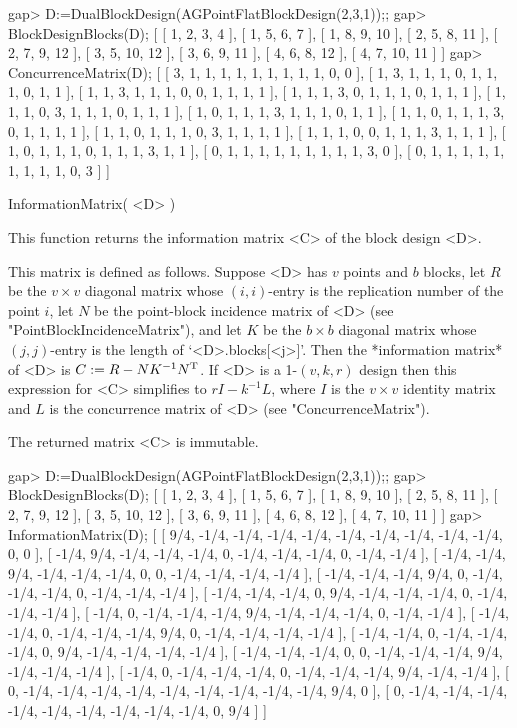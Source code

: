 \beginexample
gap> D:=DualBlockDesign(AGPointFlatBlockDesign(2,3,1));;
gap> BlockDesignBlocks(D);
[ [ 1, 2, 3, 4 ], [ 1, 5, 6, 7 ], [ 1, 8, 9, 10 ], [ 2, 5, 8, 11 ], 
  [ 2, 7, 9, 12 ], [ 3, 5, 10, 12 ], [ 3, 6, 9, 11 ], [ 4, 6, 8, 12 ], 
  [ 4, 7, 10, 11 ] ]
gap> ConcurrenceMatrix(D);
[ [ 3, 1, 1, 1, 1, 1, 1, 1, 1, 1, 0, 0 ], 
  [ 1, 3, 1, 1, 1, 0, 1, 1, 1, 0, 1, 1 ], 
  [ 1, 1, 3, 1, 1, 1, 0, 0, 1, 1, 1, 1 ], 
  [ 1, 1, 1, 3, 0, 1, 1, 1, 0, 1, 1, 1 ], 
  [ 1, 1, 1, 0, 3, 1, 1, 1, 0, 1, 1, 1 ], 
  [ 1, 0, 1, 1, 1, 3, 1, 1, 1, 0, 1, 1 ], 
  [ 1, 1, 0, 1, 1, 1, 3, 0, 1, 1, 1, 1 ], 
  [ 1, 1, 0, 1, 1, 1, 0, 3, 1, 1, 1, 1 ], 
  [ 1, 1, 1, 0, 0, 1, 1, 1, 3, 1, 1, 1 ], 
  [ 1, 0, 1, 1, 1, 0, 1, 1, 1, 3, 1, 1 ], 
  [ 0, 1, 1, 1, 1, 1, 1, 1, 1, 1, 3, 0 ], 
  [ 0, 1, 1, 1, 1, 1, 1, 1, 1, 1, 0, 3 ] ]
\endexample

\>InformationMatrix( <D> )

This function returns the information matrix <C> of the block design <D>.

This matrix is defined as follows. Suppose <D> has $v$ points and $b$
blocks, let $R$ be the $v\times v$ diagonal matrix whose $(i,i)$-entry
is the replication number of the point $i$, let $N$ be the point-block
incidence matrix of <D> (see "PointBlockIncidenceMatrix"), and let $K$
be the $b\times b$ diagonal matrix whose $(j,j)$-entry is the length of
`<D>.blocks[<j>]'. Then the *information matrix* of <D> is 
$C:=R-NK^{-1}N^{\rm T}$. If <D> is a 1-$(v,k,r)$ design then this expression
for <C> simplifies to $rI-k^{-1}L$, where $I$ is the $v\times v$ identity
matrix and $L$ is the concurrence matrix of <D> (see "ConcurrenceMatrix").

The returned matrix <C> is immutable.

\beginexample
gap> D:=DualBlockDesign(AGPointFlatBlockDesign(2,3,1));;
gap> BlockDesignBlocks(D);
[ [ 1, 2, 3, 4 ], [ 1, 5, 6, 7 ], [ 1, 8, 9, 10 ], [ 2, 5, 8, 11 ], 
  [ 2, 7, 9, 12 ], [ 3, 5, 10, 12 ], [ 3, 6, 9, 11 ], [ 4, 6, 8, 12 ], 
  [ 4, 7, 10, 11 ] ]
gap> InformationMatrix(D);
[ [ 9/4, -1/4, -1/4, -1/4, -1/4, -1/4, -1/4, -1/4, -1/4, -1/4, 0, 0 ], 
  [ -1/4, 9/4, -1/4, -1/4, -1/4, 0, -1/4, -1/4, -1/4, 0, -1/4, -1/4 ], 
  [ -1/4, -1/4, 9/4, -1/4, -1/4, -1/4, 0, 0, -1/4, -1/4, -1/4, -1/4 ], 
  [ -1/4, -1/4, -1/4, 9/4, 0, -1/4, -1/4, -1/4, 0, -1/4, -1/4, -1/4 ], 
  [ -1/4, -1/4, -1/4, 0, 9/4, -1/4, -1/4, -1/4, 0, -1/4, -1/4, -1/4 ], 
  [ -1/4, 0, -1/4, -1/4, -1/4, 9/4, -1/4, -1/4, -1/4, 0, -1/4, -1/4 ], 
  [ -1/4, -1/4, 0, -1/4, -1/4, -1/4, 9/4, 0, -1/4, -1/4, -1/4, -1/4 ], 
  [ -1/4, -1/4, 0, -1/4, -1/4, -1/4, 0, 9/4, -1/4, -1/4, -1/4, -1/4 ], 
  [ -1/4, -1/4, -1/4, 0, 0, -1/4, -1/4, -1/4, 9/4, -1/4, -1/4, -1/4 ], 
  [ -1/4, 0, -1/4, -1/4, -1/4, 0, -1/4, -1/4, -1/4, 9/4, -1/4, -1/4 ], 
  [ 0, -1/4, -1/4, -1/4, -1/4, -1/4, -1/4, -1/4, -1/4, -1/4, 9/4, 0 ], 
  [ 0, -1/4, -1/4, -1/4, -1/4, -1/4, -1/4, -1/4, -1/4, -1/4, 0, 9/4 ] ]
\endexample

